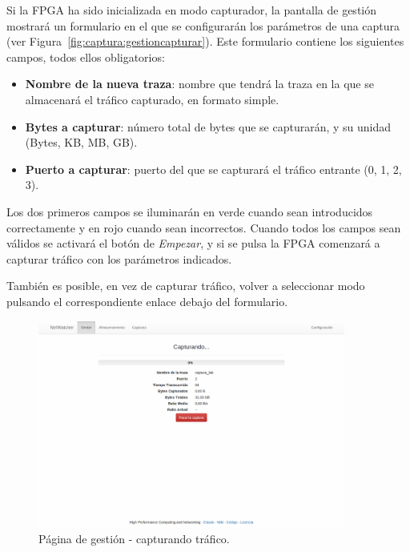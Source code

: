Si la \gls{FPGA} ha sido inicializada en modo capturador, la pantalla de gestión mostrará un formulario en el que se configurarán los parámetros de una captura (ver Figura~\ref{fig:captura:gestioncapturar}).
Este formulario contiene los siguientes campos, todos ellos obligatorios:
\begin{itemize}
  \item \textbf{Nombre de la nueva \gls{traza}}: nombre que tendrá la \gls{traza} en la que se almacenará el tráfico capturado, en formato \gls{simple}.
  \item \textbf{Bytes a capturar}: número total de bytes que se capturarán, y su unidad (Bytes, KB, MB, GB).
  \item \textbf{Puerto a capturar}: puerto del que se capturará el tráfico entrante (0, 1, 2, 3).
\end{itemize}

Los dos primeros campos se iluminarán en verde cuando sean introducidos correctamente y en rojo cuando sean incorrectos.
Cuando todos los campos sean válidos se activará el botón de \textit{Empezar}, y si se pulsa la \gls{FPGA} comenzará a capturar tráfico con los parámetros indicados.

También es posible, en vez de capturar tráfico, volver a seleccionar modo pulsando el correspondiente enlace debajo del formulario.

\begin{figure}[!htp]
  \centering
  \includegraphics[width=0.9\textwidth,clip=true]{graphics/capturas/gestor_capturando}
  \caption{Página de gestión - capturando tráfico.}
  \label{fig:captura:gestioncapturando}
\end{figure}

